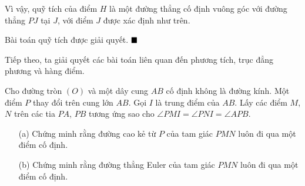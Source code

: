 \documentclass{article} %
\newenvironment{solution}[1][Lời giải]{%
  \proof[\faPenNib \hspace{0.2cm} \ttfamily \scshape \large #1]%
}{\(\hfill \blacksquare\){\parfillskip0pt\par}}
\begin{document}
\begin{solution}
\begin{enumerate}
\begin{enumerate}[leftmargin=1.25cm]
                \end{enumerate}

                Vì vậy, quỹ tích của điểm \(H\) là một đường thẳng cố định vuông góc với đường thẳng \(PJ\) tại \(J\), với điểm \(J\) được xác định như trên.
                
            \end{enumerate}

        Bài toán quỹ tích được giải quyết.
        \end{solution}

        Tiếp theo, ta giải quyết các bài toán liên quan đến phương tích, trục đẳng phương và hàng điểm.

        \begin{problem}
            Cho đường tròn \((O)\) và một dây cung \(AB\) cố định không là đường kính. Một điểm \(P\) thay đổi trên cung lớn \(AB\). Gọi \(I\) là trung điểm của \(AB\). Lấy các điểm \(M\), \(N\) trên các tia \(PA\), \(PB\) tương ứng sao cho \(\angle PMI = \angle PNI = \angle APB\).
            \begin{enumerate}
                \item[(a)] Chứng minh rằng đường cao kẻ từ \(P\) của tam giác \(PMN\) luôn đi qua một điểm cố định.
                \item[(b)] Chứng minh rằng đường thẳng Euler của tam giác \(PMN\) luôn đi qua một điểm cố định.
            \end{enumerate}
        \end{problem}
\end{document}
